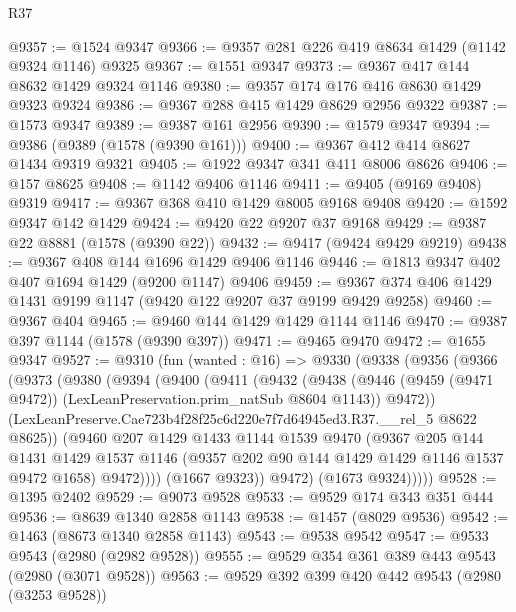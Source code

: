 \begin{lexlean}{R37}
\begin{coremodule}
@9357 := @1524 @9347
@9366 := @9357 @281 @226 @419 @8634 @1429 (@1142 @9324 @1146) @9325
@9367 := @1551 @9347
@9373 := @9367 @417 @144 @8632 @1429 @9324 @1146
@9380 := @9357 @174 @176 @416 @8630 @1429 @9323 @9324
@9386 := @9367 @288 @415 @1429 @8629 @2956 @9322
@9387 := @1573 @9347
@9389 := @9387 @161 @2956
@9390 := @1579 @9347
@9394 := @9386 (@9389 (@1578 (@9390 @161)))
@9400 := @9367 @412 @414 @8627 @1434 @9319 @9321
@9405 := @1922 @9347 @341 @411 @8006 @8626
@9406 := @157 @8625
@9408 := @1142 @9406 @1146
@9411 := @9405 (@9169 @9408) @9319
@9417 := @9367 @368 @410 @1429 @8005 @9168 @9408
@9420 := @1592 @9347 @142 @1429
@9424 := @9420 @22 @9207 @37 @9168
@9429 := @9387 @22 @8881 (@1578 (@9390 @22))
@9432 := @9417 (@9424 @9429 @9219)
@9438 := @9367 @408 @144 @1696 @1429 @9406 @1146
@9446 := @1813 @9347 @402 @407 @1694 @1429 (@9200 @1147) @9406
@9459 := @9367 @374 @406 @1429 @1431 @9199 @1147 (@9420 @122 @9207 @37 @9199 @9429 @9258)
@9460 := @9367 @404
@9465 := @9460 @144 @1429 @1429 @1144 @1146
@9470 := @9387 @397 @1144 (@1578 (@9390 @397))
@9471 := @9465 @9470
@9472 := @1655 @9347
@9527 := @9310
    (fun (wanted : @16) =>
    @9330
      (@9338
        (@9356
          (@9366
            (@9373
              (@9380
                (@9394
                  (@9400
                    (@9411
                      (@9432
                        (@9438
                          (@9446
                            (@9459 (@9471 @9472))
                            (LexLeanPreservation.prim_natSub @8604 @1143))
                          @9472))
                      (LexLeanPreserve.Cae723b4f28f25c6d220e7f7d64945ed3.R37.__rel_5 @8622 @8625))
                    (@9460
                      @207
                      @1429
                      @1433
                      @1144
                      @1539
                      @9470
                      (@9367
                        @205
                        @144
                        @1431
                        @1429
                        @1537
                        @1146
                        (@9357 @202 @90 @144 @1429 @1429 @1146 @1537 @9472 @1658)
                        @9472))))
                (@1667 @9323))
              @9472)
            (@1673 @9324)))))
@9528 := @1395 @2402
@9529 := @9073 @9528
@9533 := @9529 @174 @343 @351 @444
@9536 := @8639 @1340 @2858 @1143
@9538 := @1457 (@8029 @9536)
@9542 := @1463 (@8673 @1340 @2858 @1143)
@9543 := @9538 @9542
@9547 := @9533 @9543 (@2980 (@2982 @9528))
@9555 := @9529 @354 @361 @389 @443 @9543 (@2980 (@3071 @9528))
@9563 := @9529 @392 @399 @420 @442 @9543 (@2980 (@3253 @9528))

\end{coremodule}
\end{lexlean}
